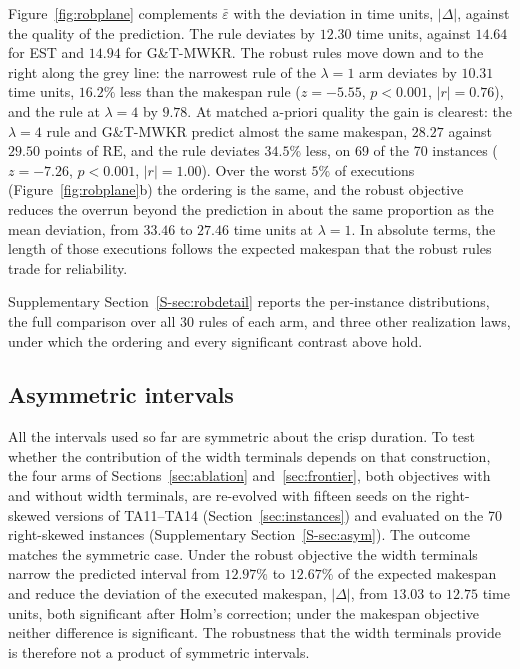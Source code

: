 \documentclass[preprint,number,sort&compress,12pt]{elsarticle}
\newcommand{\RE}{\mathrm{RE}}
\begin{document}
Figure~\ref{fig:robplane} complements $\bar\varepsilon$ with the
deviation in time units, $|\Delta|$, against the quality of the
prediction. The rule deviates by $12.30$ time units, against $14.64$ for
EST and $14.94$ for G\&T-MWKR. The robust rules move down and to the right along the grey
line: the narrowest rule of the $\lambda{=}1$ arm deviates by $10.31$
time units, $16.2\%$ less than the makespan rule ($z=-5.55$, $p<0.001$,
$|r|=0.76$), and the rule at $\lambda{=}4$ by $9.78$. At matched a-priori
quality the gain is clearest: the $\lambda{=}4$ rule and G\&T-MWKR
predict almost the same makespan, $28.27$ against $29.50$ points of
$\RE$, and the rule deviates $34.5\%$ less, on 69 of the 70 instances
($z=-7.26$, $p<0.001$, $|r|=1.00$). Over the worst $5\%$ of executions
(Figure~\ref{fig:robplane}b) the ordering is the same, and the robust
objective reduces the overrun beyond the prediction in about the same
proportion as the mean deviation, from $33.46$ to $27.46$ time units at
$\lambda{=}1$. In absolute terms, the length of those executions follows
the expected makespan that the robust rules trade for reliability.

Supplementary Section~\ref{S-sec:robdetail} reports the per-instance
distributions, the full comparison over all 30 rules of each arm, and
three other realization laws, under which the ordering and every significant
contrast above hold.

\subsection{Asymmetric intervals}
\label{sec:asym}

All the intervals used so far are symmetric about the crisp duration.
To test whether the contribution of the width terminals depends on that
construction, the four arms of Sections~\ref{sec:ablation}
and~\ref{sec:frontier}, both objectives with and without width
terminals, are re-evolved with fifteen seeds on the right-skewed
versions of TA11--TA14 (Section~\ref{sec:instances}) and evaluated on
the 70 right-skewed instances (Supplementary Section~\ref{S-sec:asym}).
The outcome matches the symmetric case. Under the robust objective the
width terminals narrow the predicted interval from $12.97\%$ to
$12.67\%$ of the expected makespan and reduce the deviation of the
executed makespan, $|\Delta|$, from $13.03$ to $12.75$ time units, both
significant after Holm's correction; under the makespan objective
neither difference is significant. The robustness that the width
terminals provide is therefore not a product of symmetric intervals.
\end{document}
